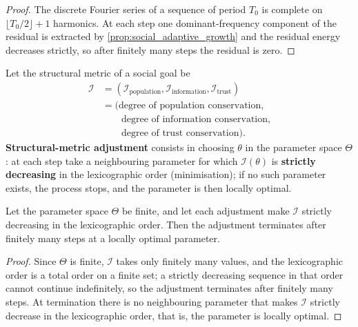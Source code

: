 \begin{proof}
The discrete Fourier series of a sequence of period $T_0$ is complete on $\lfloor T_0/2\rfloor+1$ harmonics. At each step one dominant-frequency component of the residual is extracted by \cref{prop:social_adaptive_growth} and the residual energy decreases strictly, so after finitely many steps the residual is zero.
\end{proof}

\begin{definition}\label{def:social_structure_metric_adjustment}
Let the structural metric of a social goal be
\[
\begin{aligned}
\mathcal I&=(\mathcal I_{\text{population}},\mathcal I_{\text{information}},\mathcal I_{\text{trust}})\\
&=\bigl(\text{degree of population conservation},\\
&\qquad\text{degree of information conservation},\\
&\qquad\text{degree of trust conservation}\bigr).
\end{aligned}
\]
\textbf{Structural-metric adjustment} consists in choosing $\theta$ in the parameter space $\Theta$: at each step take a neighbouring parameter for which $\mathcal I(\theta)$ is \textbf{strictly decreasing} in the lexicographic order (minimisation); if no such parameter exists, the process stops, and the parameter is then locally optimal.
\end{definition}

\begin{proposition}\label{prop:social_structure_metric_convergence}
Let the parameter space $\Theta$ be finite, and let each adjustment make $\mathcal I$ strictly decreasing in the lexicographic order. Then the adjustment terminates after finitely many steps at a locally optimal parameter.
\end{proposition}

\begin{proof}
Since $\Theta$ is finite, $\mathcal I$ takes only finitely many values, and the lexicographic order is a total order on a finite set; a strictly decreasing sequence in that order cannot continue indefinitely, so the adjustment terminates after finitely many steps. At termination there is no neighbouring parameter that makes $\mathcal I$ strictly decrease in the lexicographic order, that is, the parameter is locally optimal.
\end{proof}

